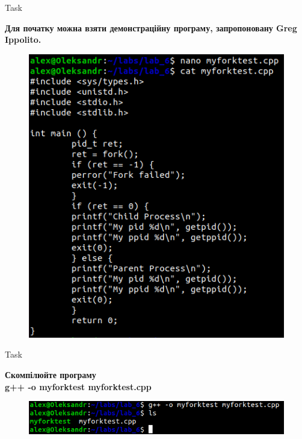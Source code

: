 \documentclass[a4paper,12pt]{article}
\newcommand{\RomanNumeralCaps}[1]{\MakeUppercase{\romannumeral #1}}
\begin{document}
\newpage
    \begin{center}
        \Large{Task \RomanNumeralCaps{1}}
    \end{center}
    \textbf{Для початку можна взяти демонстраційну програму, запропоновану Greg Ippolito.}
    \begin{figure}[h!]
        \begin{minipage}[h]{1\linewidth}
            \centering
            \includegraphics[width=0.6\linewidth]{Prt sc/Figure_1.png}  
        \end{minipage}
    \end{figure}
    \begin{center}
        \Large{Task \RomanNumeralCaps{2}}
    \end{center}
    \textbf{Скомпілюйте програму \\
    g++ -o myforktest myforktest.cpp}
    \begin{figure}[h!]
        \begin{minipage}[h]{1\linewidth}
            \centering
            \includegraphics[width=0.6\linewidth]{Prt sc/Figure_2.png}  
        \end{minipage}
    \end{figure}
\end{document}
